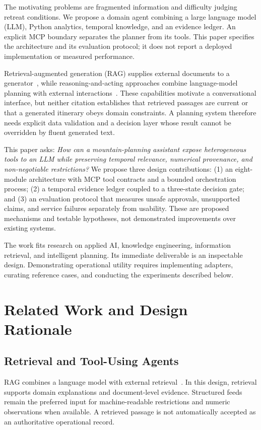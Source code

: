 \documentclass[conference]{IEEEtran}
\begin{document}
The motivating problems are fragmented information and difficulty judging retreat conditions. We propose a domain agent combining a large language model (LLM), Python analytics, temporal knowledge, and an evidence ledger. An explicit MCP boundary separates the planner from its tools. This paper specifies the architecture and its evaluation protocol; it does not report a deployed implementation or measured performance.

Retrieval-augmented generation (RAG) supplies external documents to a generator~\cite{rag}, while reasoning-and-acting approaches combine language-model planning with external interactions~\cite{react}. These capabilities motivate a conversational interface, but neither citation establishes that retrieved passages are current or that a generated itinerary obeys domain constraints. A planning system therefore needs explicit data validation and a decision layer whose result cannot be overridden by fluent generated text.

This paper asks: \emph{How can a mountain-planning assistant expose heterogeneous tools to an LLM while preserving temporal relevance, numerical provenance, and non-negotiable restrictions?} We propose three design contributions: (1) an eight-module architecture with MCP tool contracts and a bounded orchestration process; (2) a temporal evidence ledger coupled to a three-state decision gate; and (3) an evaluation protocol that measures unsafe approvals, unsupported claims, and service failures separately from usability. These are proposed mechanisms and testable hypotheses, not demonstrated improvements over existing systems.

The work fits research on applied AI, knowledge engineering, information retrieval, and intelligent planning. Its immediate deliverable is an inspectable design. Demonstrating operational utility requires implementing adapters, curating reference cases, and conducting the experiments described below.

\section{Related Work and Design Rationale}
\subsection{Retrieval and Tool-Using Agents}
RAG combines a language model with external retrieval~\cite{rag}. In this design, retrieval supports domain explanations and document-level evidence. Structured feeds remain the preferred input for machine-readable restrictions and numeric observations when available. A retrieved passage is not automatically accepted as an authoritative operational record.
\end{document}
